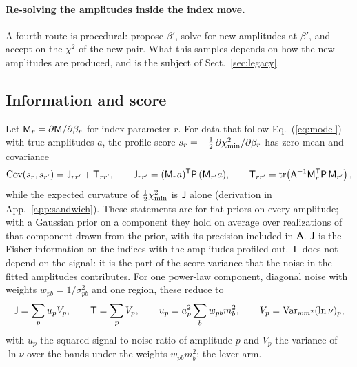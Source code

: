 \paragraph{Re-solving the amplitudes inside the index move.} A fourth route is procedural: propose
$\beta'$, solve for new amplitudes at $\beta'$, and accept on the $\chi^2$ of the new pair. What this
samples depends on how the new amplitudes are produced, and is the subject of
Sect.~\ref{sec:legacy}.

\subsection{Information and score}

Let $\mathsf{M}_r = \partial \mathsf{M}/\partial\beta_r$ for index parameter $r$. For data that follow
Eq.~(\ref{eq:model}) with true amplitudes $a$, the profile score
$s_r = -\tfrac12\,\partial\chi^2_{\min}/\partial\beta_r$ has zero mean and covariance
\begin{equation}
  \mathrm{Cov}(s_r, s_{r'}) = \mathsf{J}_{rr'} + \mathsf{T}_{rr'}, \qquad
  \mathsf{J}_{rr'} = (\mathsf{M}_r a)^{\mathsf{T}} \mathsf{P}\, (\mathsf{M}_{r'} a), \qquad
  \mathsf{T}_{rr'} = \mathrm{tr}\!\left(\mathsf{A}^{-1} \mathsf{M}_r^{\mathsf{T}} \mathsf{P}\, \mathsf{M}_{r'}\right),
  \label{eq:JT}
\end{equation}
while the expected curvature of $\tfrac12\chi^2_{\min}$ is $\mathsf{J}$ alone (derivation in
App.~\ref{app:sandwich}). These statements are for flat priors on every amplitude; with a Gaussian
prior on a component they hold on average over realizations of that component drawn from the prior,
with its precision included in $\mathsf{A}$. $\mathsf{J}$ is the Fisher information on the indices with the amplitudes
profiled out. $\mathsf{T}$ does not depend on the signal: it is the part of the score variance that the
noise in the fitted amplitudes contributes. For one power-law component, diagonal noise with weights
$w_{pb} = 1/\sigma_{pb}^2$ and one region, these reduce to
\begin{equation}
  \mathsf{J} = \sum_p u_p V_p, \qquad \mathsf{T} = \sum_p V_p, \qquad
  u_p = a_p^2 \sum_b w_{pb} m_b^2, \qquad
  V_p = \mathrm{Var}_{w m^2}(\ln \nu)_p ,
  \label{eq:uV}
\end{equation}
with $u_p$ the squared signal-to-noise ratio of amplitude $p$ and $V_p$ the variance of $\ln\nu$ over
the bands under the weights $w_{pb} m_b^2$: the lever arm.
